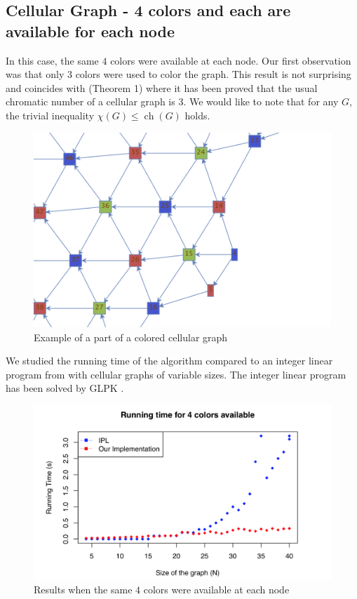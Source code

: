 \documentclass[letterpaper, 10 pt, conference]{ieeeconf}  %
\DeclareMathOperator*{\ch}{ch}
\begin{document}
\subsection{Cellular Graph - 4 colors and each are available for each node}
In this case, the same $4$ colors were available at each node. Our first observation was that only $3$ colors were used to color the graph. This result is not surprising and coincides with \cite{662943} (Theorem 1) where it has been proved that the usual chromatic number of a cellular graph is $3$. We would like to note that for any $G$, the trivial inequality $\chi(G) \leqslant \ch(G)$ holds.
\begin{figure}[!h]
\centering
\includegraphics[scale=0.4]{3colors.png}
\caption{Example of a part of a colored cellular graph}
\end{figure}

We studied the running time of the algorithm compared to an integer linear program from \cite{7248845} with cellular graphs of variable sizes.
The integer linear program has been solved by GLPK \cite{GLPK}.

\begin{figure}[!h]
\centering
\includegraphics[scale=0.4]{4colorsRunTime.png}
\caption{Results when the same $4$ colors were available at each node}
\label{4colors}
\end{figure}
\end{document}
